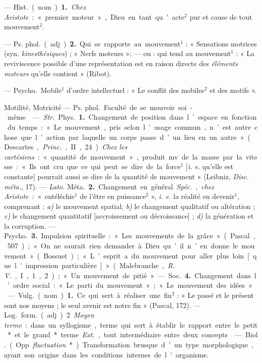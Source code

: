 \begin{itemize}[leftmargin=1cm, label=, itemsep=1pt]
 — \si{Hist.} (nom). {\bf 1.} {\it Chez Aristote} : « premier
moteur », Dieu en tant qu'acte$^2$ pur et cause de tout mouvement$^2$.

— \si{Ps. phol.} (adj.). {\bf 2.} Qui se rapporte au mouvement$^1$ :
« Sensations motrices (syn. {\it kinesthésiques}) ; « Nerfs moteurs »; — ou :
qui tend au mouvement$^1$ : « La reviviscence possible d’une représentation
est en raison directe des {\it éléments moteurs} qu’elle contient » (Ribot).

 — \si{Psycho.} Mobile$^1$ d'ordre intellectuel : « Le conflit des
mobiles$^2$ et des motifs ».

Motilité, Motricité\ib{} — \si{Ps. phol.} Faculté de se mouvoir soi-même.

 — {\it Str.} \si{Phys.} {\bf 1.} Changement de position dans
l’espace en fonction du temps : « Le mouvement, pris selon l’usage commun,
n’est autre chose que l’action par laquelle un corps passe d’un lieu en un
autre » (Descartes, {\it Princ.}, II, 24).
{\it Chez les cartésiens} : « quantité de mouvement », produit mv de la masse
par la vitesse : « Ils ont cru que ce qui peut se dire de la force$^5$
[{\it i. e.} qu’elle est constante] pourrait aussi se dire de la quantité de
mouvement » (Leibniz, {\it Disc. méta.}, 17). — {\it Lato.} \si{Méta.}
{\bf 2.} Changement en général. {\it Spéc.}, {\it chez Aristote} :
« entéléchie$^1$ de l’être en puissance$^2$ », {\it i. e.} la réalité en
devenir$^1$, comprenant : {\it a)} le mouvement spatial; {\it b)} le
changement qualitatif ou altération ; {\it c)} le changement quantitatif
[accroissement ou décroissance] ; {\it d)} la génération et la corruption. —
\si{Psycho.} {\bf 3.} Impulsion spirituelle : « Les mouvements de la
grâce » (Pascal, 507) ; « On ne saurait rien demander à Dieu qu'il n’en donne
le mouvement » (Bossuet) ; « L'esprit a du mouvement pour aller plus loin
[que l'impression particulière] » (Malebranche, {\it R. V.}, I, 1, 2) ; « Un
mouvement de pitié » — \si{Soc.} {\bf 4.} Changement dans l’ordre social :
« Le parti du mouvement » ; « Le mouvement des idées ».

 — \si{Vulg.} (nom). {\bf 1.} Ce qui sert à réaliser une fin$^2$ :
« Le passé et le présent sont nos moyens ; le seul avenir est notre
fin » (Pascal, 172). — \si{Log.} \si{form.} (adj). 2 {\it Moyen terme} : dans
un syllogisme, terme qui sert à établir le rapport entre le petit* et le
grand* terme. {\it Ext.}, tout intermédiaire entre deux concepts.

 — \si{Biol.} (Opp. {\it fluctuation}*). Transformation brusque
d’un type morphologique, ayant son origine dans les conditions internes de
l'organisme.


\end{itemize}
